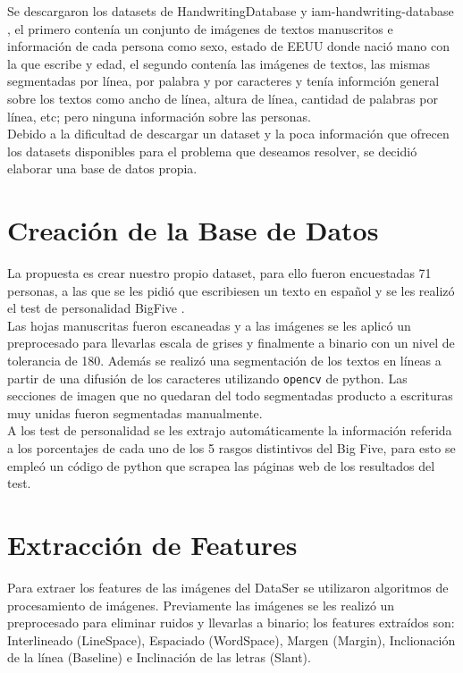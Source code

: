 \documentclass[10pt, a4paper]{article}
\begin{document}
        Se descargaron los datasets de HandwritingDatabase \cite{15} y iam-handwriting-database \cite{16}, el primero conten\'ia un conjunto de im\'agenes de textos manuscritos e informaci\'on de cada persona como sexo, estado de EEUU donde naci\'o 
        mano con la que escribe y edad, el segundo conten\'ia las im\'agenes de textos, las mismas segmentadas por l\'inea, por palabra y por caracteres y ten\'ia informci\'on general sobre los textos como 
        ancho de l\'inea, altura de l\'inea, cantidad de palabras por l\'inea, etc; pero ninguna informaci\'on sobre las personas. \\ 

        Debido a la dificultad de descargar un dataset y la poca informaci\'on que ofrecen los datasets disponibles para el problema que deseamos resolver, se decidi\'o elaborar una base de datos propia.

    \section{Creaci\'on de la Base de Datos}

        La propuesta es crear nuestro propio dataset, para ello fueron encuestadas 71 personas, a las que se les pidi\'o que escribiesen un texto 
        en espa\~nol y se les realiz\'o el test de personalidad BigFive \cite{23}. \\ 

        Las hojas manuscritas fueron escaneadas y a las im\'agenes se les aplic\'o un preprocesado para llevarlas escala de grises y finalmente a binario con un nivel de tolerancia de 180. Adem\'as se 
        realiz\'o una segmentaci\'on de los textos en l\'ineas a partir de una difusi\'on de los caracteres utilizando \texttt{opencv} de python. Las secciones de imagen que no quedaran 
        del todo segmentadas producto a escrituras muy unidas fueron segmentadas manualmente.\\ 

        A los test de personalidad se les extrajo autom\'aticamente la informaci\'on referida a los porcentajes de cada uno 
        de los 5 rasgos distintivos del Big Five, para esto se emple\'o un c\'odigo de python que scrapea las p\'aginas web de los resultados del test.\\ 

    \section{Extracci\'on de Features}
        Para extraer los features de las im\'agenes del DataSer se utilizaron algoritmos de procesamiento de im\'agenes. Previamente las im\'agenes se les realiz\'o un 
        preprocesado para eliminar ruidos y llevarlas a binario; los features extra\'idos son: Interlineado (LineSpace), Espaciado (WordSpace), Margen (Margin), Inclionaci\'on de la l\'inea (Baseline) e Inclinaci\'on de las letras (Slant). 
\end{document}
